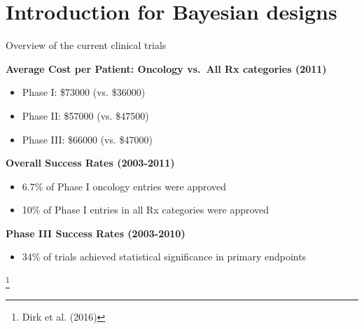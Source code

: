 \section{Introduction for Bayesian
designs}\label{introduction-for-bayesian-designs}

\begin{frame}{Overview of the current clinical trials}

\textbf{Average Cost per Patient: Oncology vs.~All Rx categories (2011)}

\begin{itemize}
\item
  Phase I: \$73000 (vs. \$36000)
\item
  Phase II: \$57000 (vs. \$47500)
\item
  Phase III: \$66000 (vs. \$47000)
\end{itemize}

\textbf{Overall Success Rates (2003-2011)}

\begin{itemize}
\item
  6.7\% of Phase I oncology entries were approved
\item
  10\% of Phase I entries in all Rx categories were approved
\end{itemize}

\textbf{Phase III Success Rates (2003-2010)}

\begin{itemize}
\tightlist
\item
  34\% of trials achieved statistical significance in primary endpoints
\end{itemize}

\footnote{Dirk et al. (2016)}

\end{frame}

